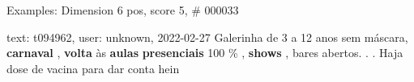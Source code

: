 \begin{frame}{Examples: Dimension 6 pos, score 5, \# 000033}
\footnotesize
\begin{exampleblock}{text: t094962, user: unknown, 2022-02-27}
Galerinha de 3 a 12 anos sem máscara, \textbf{carnaval} , \textbf{volta} às 
\textbf{aulas} \textbf{presenciais} 100 \% , \textbf{shows} , bares abertos. . 
. Haja dose de vacina para dar conta hein 
\end{exampleblock}
\end{frame}
